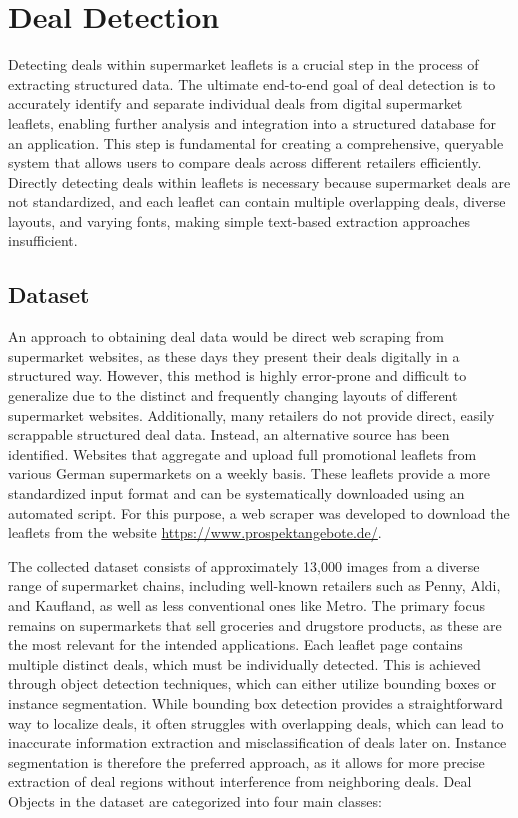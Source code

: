\documentclass[11pt]{article}
\begin{document}
\section{Deal Detection}
\label{sec:deal_detection}
Detecting deals within supermarket leaflets is a crucial step in the process of extracting structured data. The ultimate end-to-end goal of deal detection is to accurately identify and separate individual deals from digital supermarket leaflets, enabling further analysis and integration into a structured database for an application. This step is fundamental for creating a comprehensive, queryable system that allows users to compare deals across different retailers efficiently. Directly detecting deals within leaflets is necessary because supermarket deals are not standardized, and each leaflet can contain multiple overlapping deals, diverse layouts, and varying fonts, making simple text-based extraction approaches insufficient.

\subsection{Dataset}
An approach to obtaining deal data would be direct web scraping from supermarket websites, as these days they present their deals digitally in a structured way. However, this method is highly error-prone and difficult to generalize due to the distinct and frequently changing layouts of different supermarket websites. Additionally, many retailers do not provide direct, easily scrappable structured deal data. Instead, an alternative source has been identified. Websites that aggregate and upload full promotional leaflets from various German supermarkets on a weekly basis. These leaflets provide a more standardized input format and can be systematically downloaded using an automated script. For this purpose, a web scraper was developed to download the leaflets from the website \url{https://www.prospektangebote.de/}.

The collected dataset consists of approximately 13,000 images from a diverse range of supermarket chains, including well-known retailers such as Penny, Aldi, and Kaufland, as well as less conventional ones like Metro. The primary focus remains on supermarkets that sell groceries and drugstore products, as these are the most relevant for the intended applications. Each leaflet page contains multiple distinct deals, which must be individually detected. This is achieved through object detection techniques, which can either utilize bounding boxes or instance segmentation. While bounding box detection provides a straightforward way to localize deals, it often struggles with overlapping deals, which can lead to inaccurate information extraction and misclassification of deals later on. Instance segmentation is therefore the preferred approach, as it allows for more precise extraction of deal regions without interference from neighboring deals. Deal Objects in the dataset are categorized into four main classes:
\end{document}
